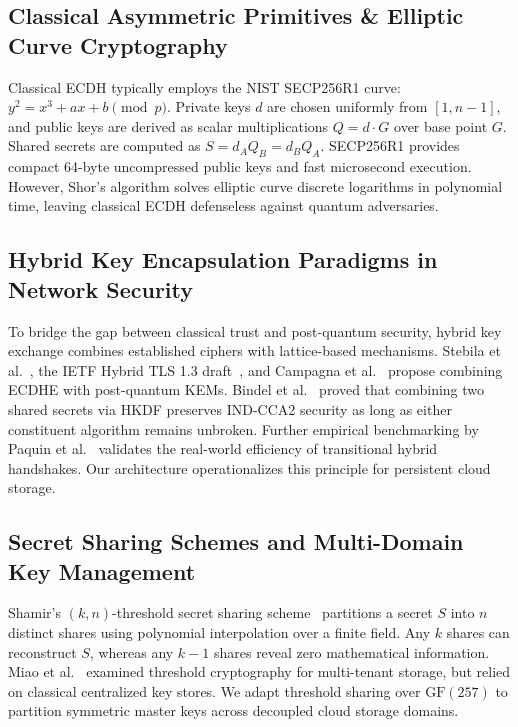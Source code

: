 \documentclass[sn-mathphys,Numbered]{sn-jnl}%
\theoremstyle{thmstyleone}%
\theoremstyle{thmstyletwo}%
\theoremstyle{thmstylethree}%
\begin{document}
\subsection{\textbf{Classical Asymmetric Primitives \& Elliptic Curve Cryptography}}
Classical ECDH typically employs the NIST SECP256R1 curve: $y^2 = x^3 + ax + b \pmod{p}$. Private keys $d$ are chosen uniformly from $[1, n-1]$, and public keys are derived as scalar multiplications $Q = d \cdot G$ over base point $G$. Shared secrets are computed as $S = d_A Q_B = d_B Q_A$. SECP256R1 provides compact 64-byte uncompressed public keys and fast microsecond execution. However, Shor's algorithm solves elliptic curve discrete logarithms in polynomial time, leaving classical ECDH defenseless against quantum adversaries.

\subsection{\textbf{Hybrid Key Encapsulation Paradigms in Network Security}}
To bridge the gap between classical trust and post-quantum security, hybrid key exchange combines established ciphers with lattice-based mechanisms. Stebila et al.~\cite{stebila2016post}, the IETF Hybrid TLS 1.3 draft~\cite{stebila2023hybrid}, and Campagna et al.~\cite{campagna2020hybrid} propose combining ECDHE with post-quantum KEMs. Bindel et al.~\cite{bindel2019hybrid} proved that combining two shared secrets via HKDF preserves IND-CCA2 security as long as either constituent algorithm remains unbroken. Further empirical benchmarking by Paquin et al.~\cite{paquin2020benchmarking} validates the real-world efficiency of transitional hybrid handshakes. Our architecture operationalizes this principle for persistent cloud storage.

\subsection{\textbf{Secret Sharing Schemes and Multi-Domain Key Management}}
Shamir's $(k, n)$-threshold secret sharing scheme~\cite{shamir1979share} partitions a secret $S$ into $n$ distinct shares using polynomial interpolation over a finite field. Any $k$ shares can reconstruct $S$, whereas any $k-1$ shares reveal zero mathematical information. Miao et al.~\cite{miao2021optimized} examined threshold cryptography for multi-tenant storage, but relied on classical centralized key stores. We adapt threshold sharing over $\text{GF}(257)$ to partition symmetric master keys across decoupled cloud storage domains.
\end{document}
